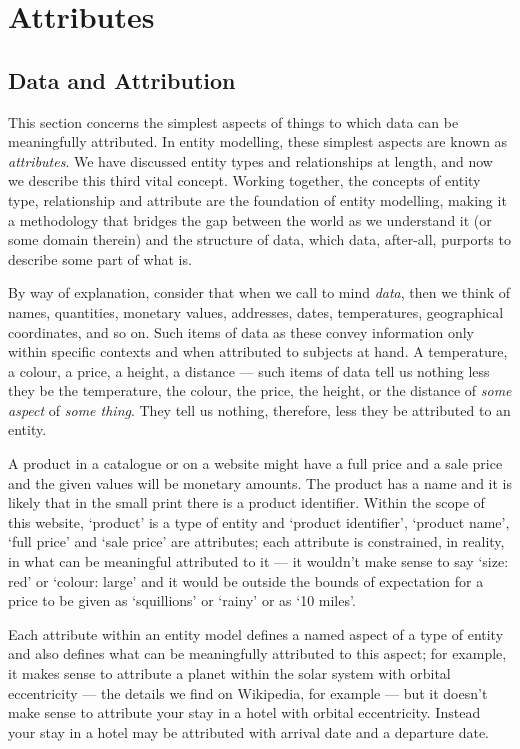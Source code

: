 

\section{Attributes}
\label{Attributes} 

\subsection{Data and Attribution}
\mynote
This section concerns the simplest aspects of things 
to which data can be meaningfully attributed. 
In entity modelling, these simplest aspects are known as \textit{attributes}.
We have  discussed entity types and relationships at length, and now  we describe this  third vital concept.
Working together, the concepts of entity type, relationship and attribute
are the foundation of entity modelling, making it a methodology that  bridges the gap between the world as we understand it (or some domain therein) and the structure of data, which data, after-all, purports to describe some part of what is. 

\mynote
By way of explanation, 
consider that when we call to mind \textit{data}, 
then we think of names, quantities, monetary values, 
addresses, dates, temperatures, geographical coordinates, and so on. 
Such items of data as these convey information only within specific contexts and when attributed 
to subjects at hand. 
A temperature, a colour, a price, a height, a distance — such items of data 
tell us nothing less they be the temperature, the colour, the price, the height, or the 
distance of \textit{some aspect} of \textit{some thing}. 
They tell us nothing, therefore, less they be attributed to an entity.

\mynote
A product in a catalogue or on a website  might have a full price and a sale price
and the given values will be monetary amounts.
The product has a name 
and it is likely that in the small print there is a product identifier.
Within the scope of this website, `product' is a type of entity
and `product identifier', `product name',  `full price' and `sale price' are attributes;
each attribute is constrained, in reality, in what can be meaningful attributed to it ---
it wouldn't make sense to say `size: red' or `colour: large' and
it  would be outside the bounds of expectation 
for a price to be given as `squillions' or `rainy' or as `10 miles'.

\mynote 
Each attribute within an entity model defines a named aspect of a type of entity and
also defines what can be meaningfully attributed to this aspect; 
for example, it makes sense to  attribute a planet within the solar system with
 orbital eccentricity
  --- the details we find on Wikipedia, for example --- 
 but it doesn't make sense to attribute your stay in a hotel with orbital eccentricity. 
 Instead your stay in a hotel may be attributed with arrival date and a departure date.

